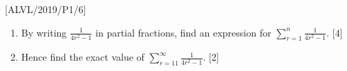 \item {[}ALVL/2019/P1/6{]}
\begin{enumerate}
\item By writing $\frac{1}{4r^{2}-1}$ in partial fractions, find an expression
for $\sum_{r=1}^{n}\frac{1}{4r^{2}-1}$.\hfill{} {[}4{]}
\item Hence find the exact value of $\sum_{r=11}^{\infty}\frac{1}{4r^{2}-1}$.
\hfill{}{[}2{]}
\end{enumerate}
